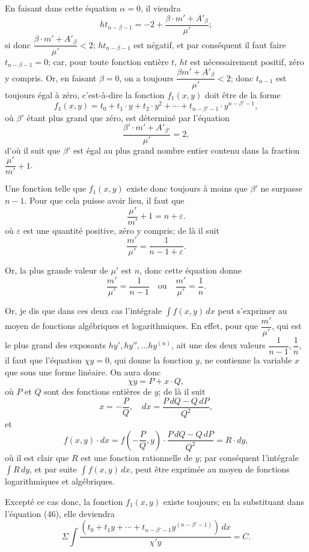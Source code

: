 \documentclass{article}
\begin{document}
En faisant dans cette équation $\alpha = 0$, il viendra
\[ ht_{n-\beta-1} = -2 + \frac{\beta \cdot m' + A'_\beta}{\mu'}; \]
si donc $\dfrac{\beta \cdot m' + A'_\beta}{\mu'} < 2$; $ht_{n-\beta-1}$ est négatif, et par conséquent il faut faire $t_{n-\beta-1} = 0$; car, pour toute fonction entière $t$, $ht$ est nécessairement positif, zéro y compris. Or, en faisant $\beta = 0$, on a toujours $\dfrac{\beta m' + A'_\beta}{\mu'} < 2$; donc $t_{n-1}$ est toujours égal à zéro, c'est-à-dire la fonction $f_1(x, y)$ doit être de la forme
\[ f_1(x, y) = t_0 + t_1 \cdot y + t_2 \cdot y^{2} + \cdots + t_{n-\beta'-1} \cdot y^{n-\beta'-1}, \tag{58} \]
où $\beta'$ étant plus grand que zéro, est déterminé par l'équation
\[ \frac{\beta' \cdot m' + A'_{\beta'}}{\mu'} = 2, \]
d'où il suit que $\beta'$ est égal au plus grand nombre entier contenu dans la fraction $\dfrac{\mu'}{m'} + 1$.

Une fonction telle que $f_1(x, y)$ existe donc toujours à moins que $\beta'$ ne surpasse $n-1$. Pour que cela puisse avoir lieu, il faut que
\[ \frac{\mu'}{m'} + 1 = n + \varepsilon. \]
où $\varepsilon$ est une quantité positive, zéro y compris; de là il suit
\[ \frac{m'}{\mu'} = \frac{1}{n-1+\varepsilon}. \]

Or, la plus grande valeur de $\mu'$ est $n$, donc cette équation donne
\[ \frac{m'}{\mu'} = \frac{1}{n-1} \quad \text{ou} \quad \frac{m'}{\mu'} = \frac{1}{n}. \]

Or, je dis que dans ces deux cas l'intégrale $\displaystyle\int f(x, y)\,dx$ peut s'exprimer au moyen de fonctions algébriques et logarithmiques. En effet, pour que $\dfrac{m'}{\mu'}$, qui est le plus grand des exposants $hy', hy'', \ldots hy^{(n)}$, ait une des deux valeurs $\dfrac{1}{n-1}, \dfrac{1}{n}$, il faut que l'équation $\chi y = 0$, qui donne la fonction $y$, ne contienne la variable $x$ que sous une forme linéaire. On aura donc
\[ \chi y = P + x \cdot Q, \]
où $P$ et $Q$ sont des fonctions entières de $y$; de là il suit
\[ x = -\frac{P}{Q}, \quad dx = \frac{P\,dQ - Q\,dP}{Q^{2}}, \]
et
\[ f(x, y) \cdot dx = f\left(-\frac{P}{Q}, y\right) \cdot \frac{P\,dQ - Q\,dP}{Q^{2}} = R \cdot dy, \]
où il est clair que $R$ est une fonction rationnelle de $y$; par conséquent l'intégrale $\displaystyle\int R\,dy$, et par suite $\displaystyle\int f(x, y)\,dx$, peut être exprimée au moyen de fonctions logarithmiques et algébriques.

Excepté ce cas donc, la fonction $f_1(x, y)$ existe toujours; en la substituant dans l'équation (46), elle deviendra
\[ \Sigma\int \frac{(t_0 + t_1 y + \cdots + t_{n-\beta'-1} y^{(n-\beta'-1)})\,dx}{\chi' y} = C. \tag{59} \]
\end{document}
